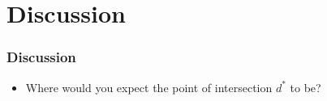 \documentclass{beamer}
\begin{document}
\section{Discussion}
\begin{frame}
  \frametitle{Discussion}
  \begin{itemize}
    \item Where would you expect the point of intersection $d^*$ to be?
  \end{itemize}
\end{frame}
\end{document}
